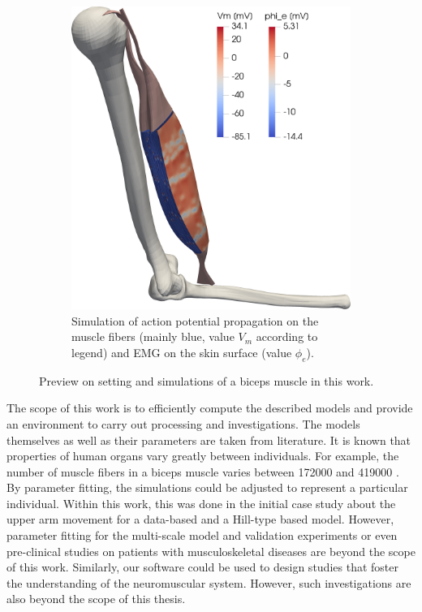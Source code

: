 \begin{figure}[H]
\begin{subfigure}[t]{0.495\textwidth}
    \includegraphics[width=\textwidth]{images/introduction/full_muscle_emg.png}%
  \caption{Simulation of action potential propagation on the muscle fibers (mainly blue, value $V_m$ according to legend) and EMG on the skin surface (value $\phi_e$).}%
    \label{fig:full_muscle_emg}%
  \end{subfigure}   
  \caption{Preview on setting and simulations of a biceps muscle in this work.}%
  \label{fig:partitioning_and_full_muscle_emg}%
\end{figure}%

The scope of this work is to efficiently compute the described models and provide an environment to carry out processing and investigations. The models themselves as well as their parameters are taken from literature. It is known that properties of human organs vary greatly between individuals. For example, the number of muscle fibers in a biceps muscle varies between \num{172000} and \num{419000} \cite{MacDougall1984}.
By parameter fitting, the simulations could be adjusted to represent a particular individual. Within this work, this was done in the initial case study about the upper arm movement for a data-based and a Hill-type based model. However, parameter fitting for the multi-scale model and validation experiments or even pre-clinical studies on patients with musculoskeletal diseases are beyond the scope of this work. Similarly, our software could be used to design studies that foster the understanding of the neuromuscular system. However, such investigations are also beyond the scope of this thesis.

